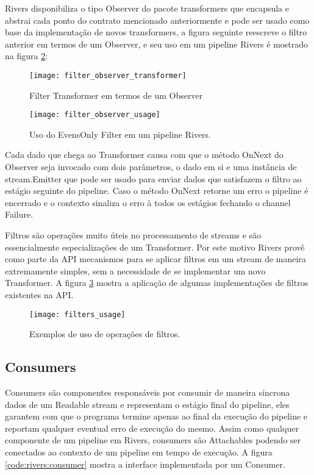 Rivers disponibiliza o tipo Observer do pacote transformers que encapsula e abstrai cada ponto do contrato mencionado anteriormente e pode ser usado como base da implementação de novos transformers, a figura seguinte reescreve o filtro anterior em termos de um Observer, e seu uso em um pipeline Rivers é mostrado na figura \ref{code:rivers:filter_observer_usage}:

\begin{figure}[H]
  \texttt{[image: filter\_observer\_transformer]}
  \centering
  \caption{Filter Transformer em termos de um Observer}
  \label{code:rivers:filter_observer_transformer}
\end{figure}

\begin{figure}[H]
  \texttt{[image: filter\_observer\_usage]}
  \centering
  \caption{Uso do EvensOnly Filter em um pipeline Rivers.}
  \label{code:rivers:filter_observer_usage}
\end{figure}

Cada dado que chega ao Transformer causa com que o método OnNext do Observer seja invocado com dois parâmetros, o dado em si e uma instância de stream.Emitter que pode ser usado para enviar dados que satisfazem o filtro ao estágio seguinte do pipeline. Caso o método OnNext retorne um erro o pipeline é encerrado e o contexto sinaliza o erro à todos os estágios fechando o channel Failure.

Filtros são operações muito úteis no processamento de streams e são essencialmente especializações de um Transformer. Por este motivo Rivers provê como parte da API mecanismos para se aplicar filtros em um stream de maneira extremamente simples, sem a necessidade de se implementar um novo Transformer. A figura \ref{code:rivers:filters_usage} mostra a aplicação de algumas implementações de filtros existentes na API.

\begin{figure}[H]
  \texttt{[image: filters\_usage]}
  \centering
  \caption{Exemplos de uso de operações de filtros.}
  \label{code:rivers:filters_usage}
\end{figure}

\subsection{Consumers}
\label{sec:rivers:consumers}

Consumers são componentes responsáveis por consumir de maneira síncrona dados de um Readable stream e representam o estágio final do pipeline, eles garantem com que o programa termine apenas ao final da execução do pipeline e reportam qualquer eventual erro de execução do mesmo. Assim como qualquer componente de um pipeline em Rivers, consumers são Attachables podendo ser conectados ao contexto de um pipeline em tempo de execução. A figura \ref{code:rivers:consumer} mostra a interface implementada por um Consumer.

